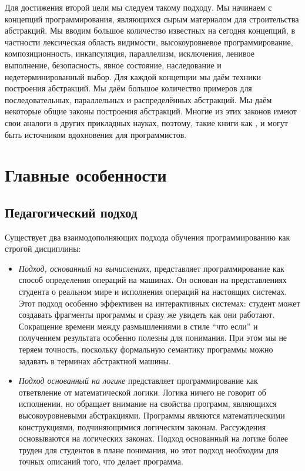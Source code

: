 Для достижения второй цели мы следуем такому подходу. Мы начинаем с концепций программирования, являющихся сырым материалом для строительства абстракций. Мы вводим большое количество известных на сегодня концепций, в частности лексическая область видимости, высокоуровневое программирование, композиционность, инкапсуляция, параллелизм, исключения, ленивое выполнение, безопасность, явное состояние, наследование и недетерминированный выбор. Для каждой концепции мы даём техники построения абстракций. Мы даём большое количество примеров для последовательных, параллельных и распределённых абстракций. Мы даём некоторые общие законы построения абстракций. Многие из этих законов имеют свои аналоги в других прикладных науках, поэтому, такие книги как \cite{69}, \cite{55} и \cite{62} могут быть источником вдохновения для программистов.

\section*{Главные особенности}

\subsection*{Педагогический подход}

Существует два взаимодополняющих подхода обучения программированию как строгой дисциплины:

\begin{itemize}
\item{\emph{Подход, основанный на вычислениях}, представляет программирование как способ определения операций на машинах. Он основан на представлениях студента о реальном мире и исполнения операций на настоящих системах. Этот подход особенно эффективен на интерактивных системах: студент может создавать фрагменты программы и сразу же увидеть как они работают. Сокращение времени между размышлениями в стиле ``что если'' и получением результата особенно полезны для понимания. При этом мы не теряем точность, поскольку формальную семантику программы можно задавать в терминах абстрактной машины.}

\item{\emph{Подход основанный на логике} представляет программирование как ответвление от математической логики. Логика ничего не говорит об исполнении, но обращает внимание на свойства программ, являющихся высокоуровневыми абстракциями. Программы являются математическими конструкциями, подчиняющимися логическим законам. Рассуждения основываются на логических законах. Подход основанный на логике более труден для студентов в плане понимания, но этот подход необходим для точных описаний того, что делает программа.}
\end{itemize}

